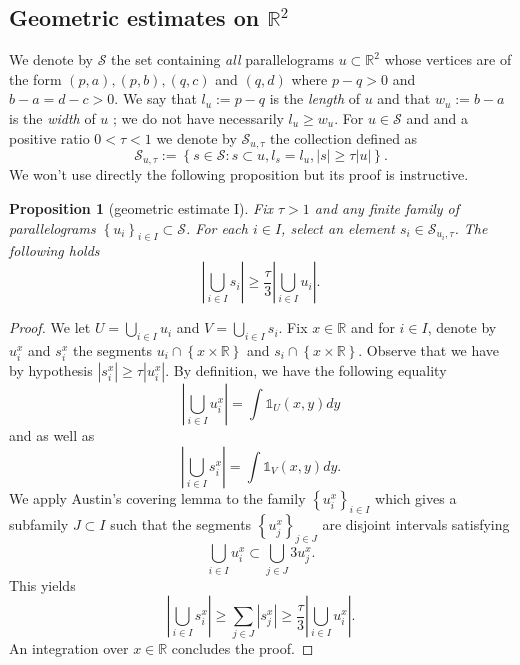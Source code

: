 \documentclass{article}
\newtheorem{prp}{Proposition}
\begin{document}
\subsection*{Geometric estimates on $\mathbb{R}^2$}

We denote by $\mathcal{S}$ the set containing \textit{all} parallelograms $u \subset \mathbb{R}^2$ whose vertices are of the form $(p,a),(p,b),(q, c)$ and $(q,d)$ where $p-q > 0$ and  $b-a = d-c > 0$. We say that $l_u := p-q$ is the \textit{length} of $u$ and that $w_u := b-a$ is the \textit{width} of $u$ ; we do not have necessarily $ l_u \geq w_u$. For $u \in \mathcal{S}$ and and a positive ratio $0 < \tau < 1$ we denote by $\mathcal{S}_{u,\tau}$ the collection defined as $$ \mathcal{S}_{u,\tau} := \left\{ s \in \mathcal{S} : s \subset u, l_s = l_u, |s| \geq \tau |u| \right\}.$$ We won't use directly the following proposition but its proof is instructive.

\begin{prp}[geometric estimate I]\label{L : First Geometric Observation}
Fix $\tau > 1$ and any finite family of parallelograms $\left\{ u_i \right\}_{ i \in I } \subset \mathcal{S}$. For each $i \in I$, select an element $s_i \in \mathcal{S}_{u_i, \tau}$. The following holds $$ \left| \bigcup_{i \in I} s_i \right| \geq \frac{\tau}{3}\left|\bigcup_{i \in I} u_i \right|.$$
\end{prp}



\begin{proof}
We let $U = \bigcup_{i \in I} u_i$ and $V = \bigcup_{i \in I} s_i $. Fix $x \in \mathbb{R}$ and for $i \in I$, denote by $u_i^x$ and $s_i^{x}$ the segments $u_i \cap \left\{ {x} \times \mathbb{R} \right\}$ and $s_i  \cap \left\{ {x} \times \mathbb{R} \right\}$. Observe that we have by hypothesis  $|s_i^{x}| \geq \tau |u_i^x|$. By definition, we have the following equality $$ \left|\bigcup_{i \in I} u_i^x\right| =  \int \mathbb{1}_U(x,y)dy$$ and as well as $$ \left|\bigcup_{i \in I} s_i^x\right| =  \int \mathbb{1}_V(x,y)dy.$$ We apply Austin's covering lemma to the family $\left\{ u_i^x \right\}_{i \in I}$ which gives a subfamily  $J \subset I$ such that the segments $\left\{ u_j^x \right\}_{j \in J} $ are disjoint intervals satisfying $$ \bigcup_{i \in I} u_i^x \subset \bigcup_{j \in J} 3 u_j^x.$$ This yields $$\left|\bigcup_{i \in I} s_i^{x}\right| \geq \sum_{j \in J} \left|s_j^x \right| \geq \frac{\tau}{3} \left|\bigcup_{i \in I} u_i^x \right|. $$ An integration over $x \in \mathbb{R}$ concludes the proof.
\end{proof}
\end{document}
